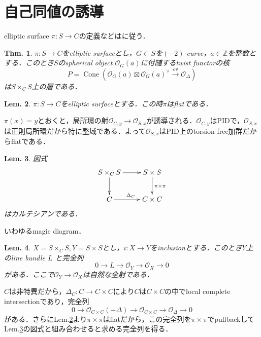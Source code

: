\documentclass[uplatex,a4paper,11pt,dvipdfmx]{jsarticle}
\makeatletter
\theoremstyle{mystyle} %
\newtheorem{theorem}{Thm.}[section]
\newtheorem{lemma}[theorem]{Lem.}
\renewenvironment{proof}[1][\proofname]{\par
 \pushQED{\qed}%
 \normalfont \topsep6\p@\@plus6\p@\relax
 \trivlist
 \item[\hskip\labelsep
 \itshape
 {\bf\underline{#1}}]\ignorespaces
}{%
 \popQED\endtrivlist\@endpefalse
}
\DeclareMathOperator{\Cone}{Cone}
\makeatother
\begin{document}
\title{}
\author{}
\date{}
\section{自己同値の誘導}
elliptic surface $\pi \colon S \to C$の定義などは\cite{Ueh15}に従う．
\begin{theorem}
	$\pi \colon S \to C$をelliptic surfaceとし，$G \subset S$を$(-2)$-curve，$a \in \mathbb{Z}$を整数とする．このとき$S$のspherical object $\mathcal{O}_G(a)$に付随するtwist functorの核$$P = \Cone(\mathcal{O}_G(a) \boxtimes \mathcal{O}_G(a)^\vee \xrightarrow{ev} \mathcal{O}_\Delta)$$は$S\times_C S$上の層である．
\end{theorem}
\begin{lemma}\label{flatness}
	$\pi \colon S \to C$をelliptic surfaceとする．この時$\pi$はflatである．
\end{lemma}
\begin{proof}
	$\pi(x)=y$とおくと，局所環の射$\mathcal{O}_{C, y} \to \mathcal{O}_{S, x}$が誘導される．$\mathcal{O}_{C, y} $はPIDで，$\mathcal{O}_{S, x}$は正則局所環だから特に整域である．よって$\mathcal{O}_{S, x}$はPID上のtorsion-free加群だからflatである．
\end{proof}
\begin{lemma}\label{Cartesian}
	図式
	\[
		\xymatrix{
			S \times_C S \ar[r] \ar[d]& S \times S \ar[d]^{\pi \times \pi}\\
			C \ar[r]^{\Delta_C} & C \times C
		}
	\]
	はカルテシアンである．
\end{lemma}
\begin{proof}
	いわゆるmagic diagram．
\end{proof}
\begin{lemma}\label{effective_divisor}
	$X = S \times_C S, Y = S \times S$とし，$i \colon X \to Y$をinclusionとする．このとき$Y$上のline bundle $L$ と完全列$$0 \to L \to \mathcal{O}_Y \to \mathcal{O}_X \to 0$$がある．ここで$\mathcal{O}_Y \to \mathcal{O}_X$は自然な全射である．
\end{lemma}
\begin{proof}
	$C$は非特異だから，$\Delta_C\colon C \to C \times C$により$C$は$C\times C$の中でlocal complete intersectionであり，完全列$$0 \to \mathcal{O}_{C\times C}(-\Delta) \to \mathcal{O}_{C \times C} \to \mathcal{O}_{\Delta} \to 0$$がある．さらにLem.\ref{flatness}より$\pi \times \pi$はflatだから，この完全列を$\pi \times \pi$でpullbackしてLem.\ref{Cartesian}の図式と組み合わせると求める完全列を得る．
\end{proof}
\end{document}

